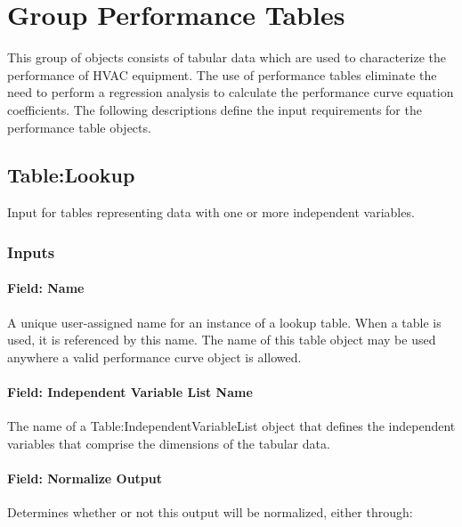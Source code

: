 \section{Group Performance Tables}\label{group-performance-tables}

This group of objects consists of tabular data which are used to characterize the performance of HVAC equipment. The use of performance tables eliminate the need to perform a regression analysis to calculate the performance curve equation coefficients. The following descriptions define the input requirements for the performance table objects.

\subsection{Table:Lookup}\label{tablelookup}

Input for tables representing data with one or more independent
variables.

\subsubsection{Inputs}\label{inputs}

\paragraph{Field: Name}\label{field-name}

A unique user-assigned name for an instance of a lookup table. When a
table is used, it is referenced by this name. The name of this table
object may be used anywhere a valid performance curve object is allowed.

\paragraph{Field: Independent Variable List
Name}\label{field-independent-variable-list-name}

The name of a Table:IndependentVariableList object that defines the
independent variables that comprise the dimensions of the tabular data.

\paragraph{Field: Normalize Output}\label{field-normalize-output}

Determines whether or not this output will be normalized, either through:

